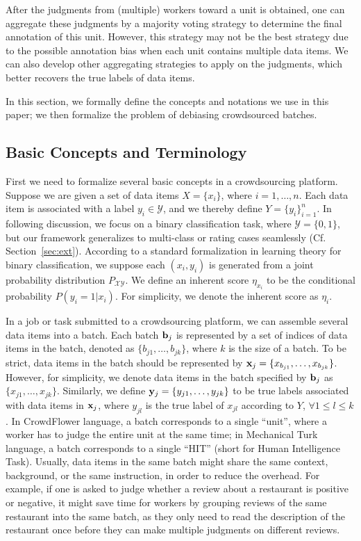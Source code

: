 {After the judgments from (multiple) workers toward a unit is obtained,
one can aggregate these judgments by a majority voting strategy to determine the final annotation of this unit.
However, this strategy may not be the best strategy due to the possible annotation bias when each unit contains multiple data items.
We can also develop other aggregating strategies to apply on the judgments,
which better recovers the true labels of data items.
}

%

In this section, we formally define the concepts and notations we use in this paper;
we then formalize the problem of debiasing crowdsourced batches.


\subsection{Basic Concepts and Terminology}

First we need to formalize several basic concepts in a crowdsourcing platform.
Suppose we are given a set of data items $X = \{x_i\}$, where $i=1, \ldots, n$.
Each data item is associated with a label $y_i \in \mathcal{Y}$, 
and we thereby define $Y = \{y_i\}_{i=1}^n$.
In following discussion, we focus on a binary classification task, 
where $\mathcal{Y} = \{0, 1\}$, 
but our framework generalizes to multi-class or rating cases seamlessly (Cf. Section~\ref{sec:ext}).  
According to a standard formalization in learning theory for binary classification, 
we suppose each $(x_i, y_i)$ is generated from a joint probability distribution $P_{\mathcal{X} \mathcal{Y}}$.
We define an inherent score $\eta_{x_i}$ to be the conditional probability $P(y_i = 1 | x_i)$.  
For simplicity, we denote the inherent score as $\eta_i$.  

In a job or task submitted to a crowdsourcing platform,
we can assemble several data items into a batch. %
Each batch ${\mathbf{b}}_j$ is represented by a set of indices of data items in the batch,
denoted as $\{b_{j1}, \ldots, b_{jk}\}$, 
where $k$ is the size of a batch. 
To be strict, data items in the batch should be represented by ${\mathbf{x}}_j = \{x_{b_{j1}}, \ldots, x_{b_{jk}}\}$.  
However, for simplicity, we denote data items in the batch specified by ${\mathbf{b}}_j$ as $\{x_{j1}, \ldots, x_{jk}\}$.  
Similarly, we define ${\mathbf{y}}_j = \{y_{j1}, \ldots, y_{jk}\}$ to be true labels associated with data items in ${\mathbf{x}}_j$, 
where $y_{jl}$ is the true label of $x_{jl}$ according to $Y$, $\forall 1 \leq l \leq k$.  
In CrowdFlower language, 
a batch corresponds to a single ``unit'', 
where a worker has to judge the entire unit at the same time;
in Mechanical Turk language,
a batch corresponds to a single ``HIT'' (short for Human Intelligence Task).
Usually, data items in the same batch might share the same context, background, or the same instruction, 
in order to reduce the overhead.  
For example, if one is asked to judge whether 
a review about a restaurant is positive or negative, 
it might save time for workers  
by grouping reviews of the same restaurant into the same batch, 
as they only need to read the description of the restaurant once 
before they can make multiple judgments on different reviews.  

